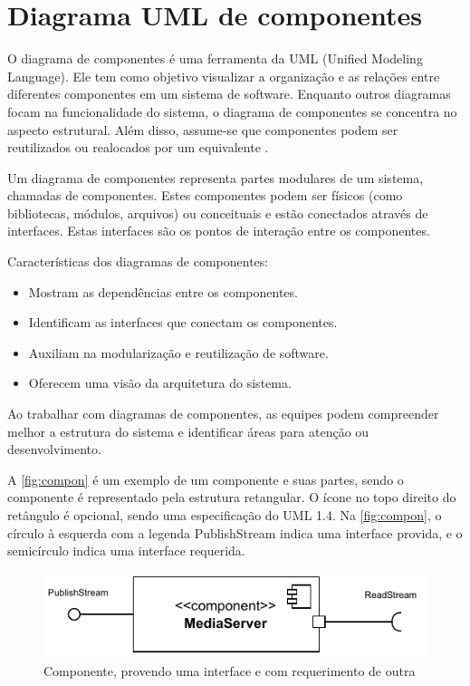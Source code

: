 \documentclass[12pt, %
openright, 
oneside, %
a4paper,    %
brazil]{facom-ufu-abntex2}
\begin{document}
\section{Diagrama UML de componentes}

O diagrama de componentes é uma ferramenta da UML (Unified Modeling Language).
Ele tem como objetivo visualizar a organização e as relações entre diferentes
componentes em um sistema de software. Enquanto outros diagramas focam na
funcionalidade do sistema, o diagrama de componentes se concentra no aspecto
estrutural. Além disso, assume-se que componentes podem ser reutilizados ou
realocados por um equivalente \cite{UMLComponentDiagrams2023}.

Um diagrama de componentes representa partes modulares de um sistema, chamadas
de componentes. Estes componentes podem ser físicos (como bibliotecas, módulos,
arquivos) ou conceituais e estão conectados através de interfaces. Estas
interfaces são os pontos de interação entre os componentes.

Características dos diagramas de componentes:
\begin{itemize}
	\item Mostram as dependências entre os componentes.
	\item Identificam as interfaces que conectam os componentes.
	\item Auxiliam na modularização e reutilização de software.
	\item Oferecem uma visão da arquitetura do sistema.
\end{itemize}

Ao trabalhar com diagramas de componentes, as equipes podem compreender melhor
a estrutura do sistema e identificar áreas para atenção ou desenvolvimento.

A \autoref{fig:compon} é um exemplo de um componente e suas partes, sendo o
componente é representado pela estrutura retangular. O ícone no topo direito do
retângulo é opcional, sendo uma especificação do UML 1.4. Na
\autoref{fig:compon}, o círculo à esquerda com a legenda PublishStream indica
uma interface provida, e o semicírculo indica uma interface requerida.


\begin{figure}[!ht]
	\centering
	\includegraphics[width=0.8\linewidth]{example_diagram.pdf}
	\caption[Componente de exemplo]{Componente, provendo uma interface e
		com requerimento de outra}
	\label{fig:compon}
\end{figure}
\end{document}
